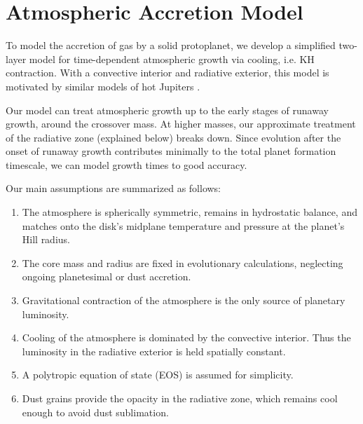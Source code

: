 \documentclass[apj, numberedappendix]{emulateapj}
\begin{document}
\section{Atmospheric Accretion Model} \label{sec:model}

To model the accretion of gas by a solid protoplanet, we develop a simplified two-layer model for time-dependent atmospheric growth via cooling, i.e. KH contraction.  With a convective interior and radiative exterior, this model is motivated by similar models of hot Jupiters \citep{ab06, ym10}. 

Our model can  treat atmospheric growth up to the early stages of runaway growth, around the crossover mass.  At higher masses, our approximate treatment of the radiative zone (explained below) breaks down.   Since evolution after the onset of runaway growth contributes minimally to the total planet formation timescale, we can model growth times to good accuracy. 

Our main assumptions are summarized as follows:
\begin{enumerate}
\item The atmosphere is spherically symmetric, remains in hydrostatic balance, and matches onto the disk's midplane temperature and pressure at the planet's Hill radius.
\item The core mass and radius are fixed in evolutionary calculations, neglecting ongoing planetesimal or dust accretion.
\item Gravitational contraction of the atmosphere is the only source of planetary luminosity.  
\item Cooling of the atmosphere is dominated by the convective interior.  Thus the luminosity in the radiative exterior is held spatially constant. 
\item A polytropic equation of state (EOS) is assumed for simplicity.
\item Dust grains provide the opacity in the radiative zone, which remains cool enough to avoid dust sublimation.
\end{enumerate}
\end{document}
